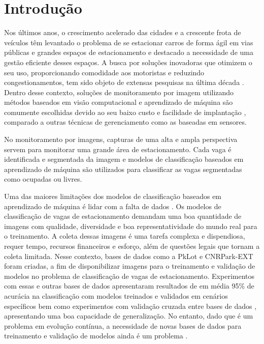 \chapter{Introdução}



Nos últimos anos, o crescimento acelerado das cidades e a crescente frota de veículos têm levantado o problema de se estacionar carros de forma ágil em vias públicas e grandes espaços de estacionamento e destacado a necessidade de uma gestão eficiente desses espaços. A busca por soluções inovadoras que otimizem o seu uso, proporcionando comodidade aos motoristas e reduzindo congestionamentos, tem sido objeto de extensas pesquisas na última década \citep{systematic-review}\citep{parking-lot-monitoring-technologies}. Dentro desse contexto, soluções de monitoramento por imagem utilizando métodos baseados em visão computacional e aprendizado de máquina são comumente escolhidas devido ao seu baixo custo e facilidade de implantação \citep{systematic-review}\citep{pklot1}\citep{cnrpark}\citep{hochuli-2}, comparado a outras técnicas de gerenciamento como as baseadas em sensores.

No monitoramento por imagens, capturas de uma alta e ampla perspectiva servem para monitorar uma grande área de estacionamento. Cada vaga é identificada e segmentada da imagem e modelos de classificação baseados em aprendizado de máquina são utilizados para classificar as vagas segmentadas como ocupadas ou livres.

Uma das maiores limitações dos modelos de classificação baseados em aprendizado de máquina é lidar com a falta de dados \citep{synthetic-pedestrians}. Os modelos de classificação de vagas de estacionamento demandam uma boa quantidade de imagens com qualidade, diversidade e boa representatividade do mundo real para o treinamento. A coleta dessas imagens é uma tarefa complexa e dispendiosa, requer tempo, recursos financeiros e esforço, além de questões legais que tornam a coleta limitada. Nesse contexto, bases de dados como a PkLot \citep{pklot2} e CNRPark-EXT \citep{cnrpark} foram criadas, a fim de disponibilizar imagens para o treinamento e validação de modelos no problema de classificação de vagas de estacionamento. Experimentos com essas e outras bases de dados apresentaram resultados de em média 95\% de acurácia na classificação com modelos treinados e validados em cenários específicos \citep{systematic-review}\citep{hochuli-1} bem como experimentos com validação cruzada entre bases de dados \citep{hochuli-2}, apresentando uma boa capacidade de generalização. No entanto, dado que é um problema em evolução contínua, a necessidade de novas bases de dados para treinamento e validação de modelos ainda é um problema \citep{systematic-review}.

